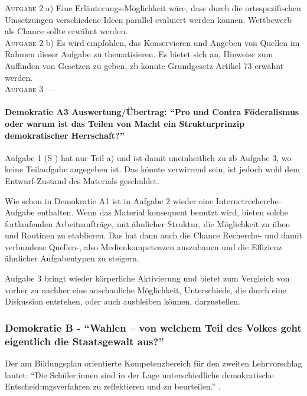 \textsc{Aufgabe 2} a) \quad
Eine Erläuterungs-Möglichkeit wäre, dass durch die ortsspezifischen Umsetzungen verschiedene Ideen parallel evaluiert werden können. 
Wettbewerb als Chance sollte erwähnt werden. 
\\

\textsc{Aufgabe 2} b) \quad
Es wird empfohlen, das Konservieren und Angeben von Quellen im Rahmen dieser Aufgabe zu thematisieren.
Es bietet sich an, Hinweise zum Auffinden von Gesetzen zu geben, \gls{zb} könnte Grundgesetz Artikel 73 erwähnt werden.
\\

\textsc{Aufgabe 3} \quad
---


\paragraph{Demokratie A3 Auswertung/Übertrag: \enquote{Pro und Contra Föderalismus oder warum ist das Teilen von Macht ein Strukturprinzip demokratischer Herrschaft?}}
Aufgabe 1 (\gls{S} \pageref{DEMOKRATIE-A3}) hat nur Teil a) und ist damit uneinheitlich zu \gls{zb} Aufgabe 3, wo keine Teilaufgabe angegeben ist. Das könnte verwirrend sein, ist jedoch wohl dem Entwurf-Zustand des Materials geschuldet. 

Wie schon in Demokratie A1 ist in Aufgabe 2 wieder eine Internetrecherche-Aufgabe enthalten. Wenn das Material konsequent benutzt wird, bieten solche fortlaufenden Arbeitsaufträge, mit ähnlicher Struktur, die Möglichkeit zu üben und Routinen zu etablieren. Das hat dann auch die Chance   Recherche- und damit verbundene Quellen-, also Medienkompetenzen auszubauen und die Effizienz ähnlicher Aufgabentypen zu steigern.

Aufgabe 3 bringt wieder körperliche Aktivierung und bietet zum Vergleich von vorher zu nachher eine anschauliche Möglichkeit, Unterschiede, die durch eine Diskussion entstehen, oder auch ausbleiben können, darzustellen. 



\subsubsection{Demokratie B - \enquote{Wahlen – von welchem Teil des Volkes geht eigentlich die Staatsgewalt aus?}}
Der am Bildungsplan orientierte Kompetenzbereich für den zweiten Lehrvorschlag %
lautet: \enquote{Die Schüler:innen sind in der Lage unterschiedliche demokratische Entscheidungsverfahren zu reflektieren und zu beurteilen.} \autocite[][16]{bplan}. 

